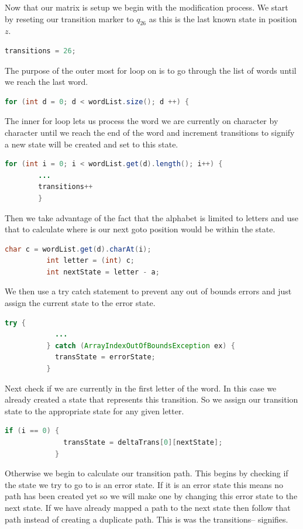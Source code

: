 \documentclass[letter, 12pt]{article}
\begin{document}
Now that our matrix is setup we begin with the modification process. We start by reseting our transition marker to $q_{26}$ as this is the last known state in position $z$. 
\begin{lstlisting}[language=Java]
      transitions = 26;
\end{lstlisting}
The purpose of the outer most for loop on is to go through the list of words until we reach the last word. 
\begin{lstlisting}[language=Java]
      for (int d = 0; d < wordList.size(); d ++) {
\end{lstlisting}
The inner for loop lets us process the word we are currently on character by character until we reach the end of the word and increment transitions to signify a new state will be created and set to this state.
\begin{lstlisting}[language=Java]
        for (int i = 0; i < wordList.get(d).length(); i++) {
        ...
        transitions++
        }
\end{lstlisting}
Then we take advantage of the fact that the alphabet is limited to letters and use that to calculate where is our next goto position would be within the state.
\begin{lstlisting}[language=Java]
          char c = wordList.get(d).charAt(i);
          int letter = (int) c;
          int nextState = letter - a;
\end{lstlisting}
 We then use a try catch statement to prevent any out of bounds errors and just assign the current state to the error state.
 \begin{lstlisting}[language=Java]
          try {
            ...
          } catch (ArrayIndexOutOfBoundsException ex) {
            transState = errorState;
          }
\end{lstlisting}
Next check if we are currently in the first letter of the word. In this case we already created a state that represents this transition. So we assign our transition state to the appropriate state for any given letter.
\begin{lstlisting}[language=Java]
            if (i == 0) {
              transState = deltaTrans[0][nextState];
            }
\end{lstlisting}
Otherwise we begin to calculate our transition path. This begins by checking if the state we try to go to is an error state. If it is an error state this means no path has been created yet so we will make one by changing this error state to the next state. If we have already mapped a path to the next state then follow that path instead of creating a duplicate path. This is was the transitions-- signifies.
\end{document}
